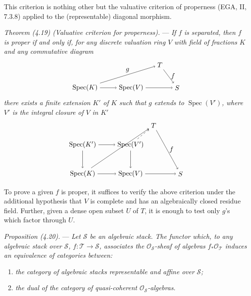 \documentclass[10pt]{article}
\newcommand{\Spec}{\operatorname{Spec}}
\newcommand{\cO}{\mathcal O}
\begin{document}
This criterion is nothing other but the valuative criterion of properness (EGA, II, 7.3.8) applied to the (representable) diagonal morphism.

\medskip
\noindent\emph{Theorem (4.19) (Valuative criterion for properness).} --- \emph{If $f$ is separated, then $f$ is proper if and only if, for any discrete valuation ring $V$ with field of fractions $K$ and any commutative diagram}
\[
\begin{tikzpicture}[baseline=(current bounding box.center)]
\node (K) at (0,0) {$\Spec(K)$};
\node (V) at (2.4,0) {$\Spec(V)$};
\node (T) at (3.9,1.2) {$T$};
\node (S) at (4.8,0) {$S$};
\draw[->] (K) -- (V);
\draw[->] (V) -- (S);
\draw[->] (T) -- node[right] {$f$} (S);
\draw[->] (K) -- node[above] {$g$} (T);
\end{tikzpicture}
\]
\emph{there exists a finite extension $K'$ of $K$ such that $g$ extends to $\Spec(V')$, where $V'$ is the integral closure of $V$ in $K'$}
\[
\begin{tikzpicture}[baseline=(current bounding box.center)]
\node (Kp) at (0,1.5) {$\Spec(K')$};
\node (Vp) at (2.5,1.5) {$\Spec(V')$};
\node (T) at (3.7,2.5) {$T$};
\node (K) at (0,0) {$\Spec(K)$};
\node (V) at (2.5,0) {$\Spec(V)$};
\node (S) at (5.1,0) {$S$};
\draw[->] (Kp) -- (Vp);
\draw[->] (K) -- (V);
\draw[->] (Kp) -- (K);
\draw[->] (Vp) -- (V);
\draw[->] (V) -- (S);
\draw[->] (T) -- node[right] {$f$} (S);
\draw[->] (K) -- (T);
\draw[->,dashed] (Vp) -- (T);
\end{tikzpicture}
\]

To prove a given $f$ is proper, it suffices to verify the above criterion under the additional hypothesis that $V$ is complete and has an algebraically closed residue field. Further, given a dense open subset $U$ of $T$, it is enough to test only $g$'s which factor through $U$.

\medskip
\noindent\emph{Proposition (4.20).} --- \emph{Let $\mathscr S$ be an algebraic stack. The functor which, to any algebraic stack over $\mathscr S$, $f:\mathscr T\to\mathscr S$, associates the $\cO_{\mathscr S}$-sheaf of algebras $f_*\cO_{\mathscr T}$ induces an equivalence of categories between:}
\begin{enumerate}[label=(\roman*)]
\item \emph{the category of algebraic stacks representable and affine over $\mathscr S$;}
\item \emph{the dual of the category of quasi-coherent $\cO_{\mathscr S}$-algebras.}
\end{enumerate}
\end{document}
